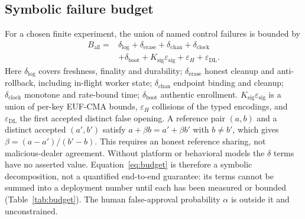 \documentclass[pdflatex,sn-mathphys-num,twocolumn]{sn-jnl}
\theoremstyle{plain}
\theoremstyle{definition}
\begin{document}
\subsection{Symbolic failure budget}
For a chosen finite experiment, the union of named control failures is bounded by
\begin{equation}\label{eq:budget}
\begin{split}
 B_{\mathrm{all}}={}&\delta_{\mathrm{log}}+\delta_{\mathrm{erase}}+\delta_{\mathrm{chan}}+\delta_{\mathrm{clock}}\\
 &+\delta_{\mathrm{boot}}+K_{\mathrm{sig}}\varepsilon_{\mathrm{sig}}+\varepsilon_H+\varepsilon_{\mathrm{DL}}.
\end{split}
\end{equation}
Here $\delta_{\mathrm{log}}$ covers freshness, finality and durability; $\delta_{\mathrm{erase}}$ honest cleanup and anti-rollback, including in-flight worker state; $\delta_{\mathrm{chan}}$ endpoint binding and cleanup; $\delta_{\mathrm{clock}}$ monotone and rate-bound time; $\delta_{\mathrm{boot}}$ authentic enrollment. $K_{\mathrm{sig}}\varepsilon_{\mathrm{sig}}$ is a union of per-key EUF-CMA bounds, $\varepsilon_H$ collisions of the typed encodings, and $\varepsilon_{\mathrm{DL}}$ the first accepted distinct false opening. A reference pair $(a,b)$ and a distinct accepted $(a',b')$ satisfy $a+\beta b=a'+\beta b'$ with $b\ne b'$, which gives $\beta=(a-a')/(b'-b)$. This requires an honest reference sharing, not malicious-dealer agreement. Without platform or behavioral models the $\delta$ terms have no asserted value. Equation~\eqref{eq:budget} is therefore a symbolic decomposition, not a quantified end-to-end guarantee: its terms cannot be summed into a deployment number until each has been measured or bounded (Table~\ref{tab:budget}). The human false-approval probability $\alpha$ is outside it and unconstrained.
\end{document}
